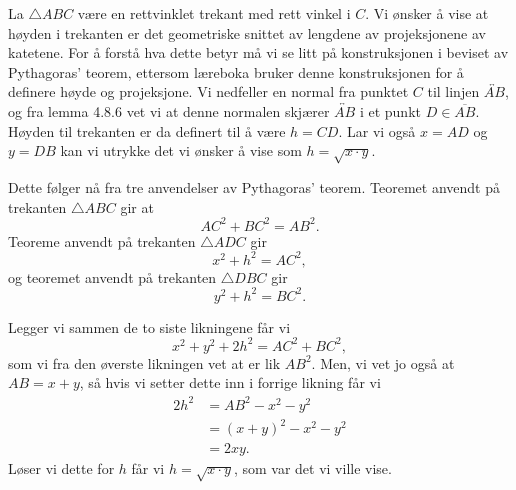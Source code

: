 \begin{oppgave}[5.4.1]
    La $\triangle ABC$ være en rettvinklet trekant med rett vinkel i $C$. 
    Vi ønsker å vise at høyden i trekanten er det geometriske snittet av lengdene av projeksjonene av katetene. 
    For å forstå hva dette betyr må vi se litt på konstruksjonen i beviset av Pythagoras' teorem, ettersom læreboka bruker denne konstruksjonen for å definere høyde og projeksjone. 
    Vi nedfeller en normal fra punktet $C$ til linjen $\overleftrightarrow{AB}$, og fra lemma 4.8.6 vet vi at denne normalen skjærer $\overleftrightarrow{AB}$ i et punkt $D\in \overline{AB}$. 
    Høyden til trekanten er da definert til å være $h=CD$. 
    Lar vi også $x=AD$ og $y=DB$ kan vi utrykke det vi ønsker å vise som $h=\sqrt{x\cdot y}$. 

    \begin{figure}[H]
        \centering
         
    \end{figure}

    Dette følger nå fra tre anvendelser av Pythagoras' teorem. 
    Teoremet anvendt på trekanten $\triangle ABC$ gir at 
    $$AC^2+BC^2=AB^2.$$
    Teoreme anvendt på trekanten $\triangle ADC$ gir 
    $$x^2+h^2=AC^2,$$
    og teoremet anvendt på trekanten $\triangle DBC$ gir 
    $$y^2+h^2=BC^2.$$

    Legger vi sammen de to siste likningene får vi 
    $$x^2+y^2+2h^2=AC^2+BC^2,$$
    som vi fra den øverste likningen vet at er lik $AB^2$. 
    Men, vi vet jo også at $AB=x+y$, så hvis vi setter dette inn i forrige likning får vi 
    \begin{align*}
        2h^2
        &=AB^2-x^2-y^2\\
        &=(x+y)^2-x^2-y^2\\
        &= 2xy.
    \end{align*}
    Løser vi dette for $h$ får vi $h=\sqrt{x\cdot y}$, som var det vi ville vise.  
\end{oppgave}

